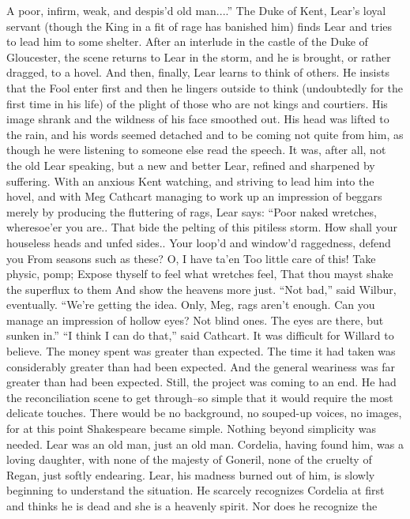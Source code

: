 \documentclass[a4paper,12pt]{article}
\begin{document}
A poor, infirm, weak, and despis’d old man....”
The Duke of Kent, Lear’s loyal servant (though the King in a fit of rage has banished him) finds
Lear and tries to lead him to some shelter. After an interlude in the castle of the Duke of Gloucester, the
scene returns to Lear in the storm, and he is brought, or rather dragged, to a hovel.
And then, finally, Lear learns to think of others. He insists that the Fool enter first and then he
lingers outside to think (undoubtedly for the first time in his life) of the plight of those who are not kings
and courtiers.
His image shrank and the wildness of his face smoothed out. His head was lifted to the rain, and
his words seemed detached and to be coming not quite from him, as though he were listening to someone
else read the speech. It was, after all, not the old Lear speaking, but a new and better Lear, refined and
sharpened by suffering. With an anxious Kent watching, and striving to lead him into the hovel, and with
Meg Cathcart managing to work up an impression of beggars merely by producing the fluttering of rags,
Lear says:
“Poor naked wretches, wheresoe’er you are..
That bide the pelting of this pitiless storm.
How shall your houseless heads and unfed sides..
Your loop’d and window’d raggedness, defend you
From seasons such as these? O, I have ta’en
Too little care of this! Take physic, pomp;
Expose thyself to feel what wretches feel,
That thou mayst shake the superflux to them
And show the heavens more just.
“Not bad,” said Wilbur, eventually. “We’re getting the idea.
Only, Meg, rags aren’t enough. Can you manage an impression of hollow eyes? Not blind ones.
The eyes are there, but sunken in.”
“I think I can do that,” said Cathcart.
It was difficult for Willard to believe. The money spent was greater than expected. The time it had
taken was considerably greater than had been expected. And the general weariness was far greater than had
been expected. Still, the project was coming to an end.
He had the reconciliation scene to get through--so simple that it would require the most delicate
touches. There would be no background, no souped-up voices, no images, for at this point Shakespeare
became simple. Nothing beyond simplicity was needed.
Lear was an old man, just an old man. Cordelia, having found him, was a loving daughter, with
none of the majesty of Goneril, none of the cruelty of Regan, just softly endearing.
Lear, his madness burned out of him, is slowly beginning to understand the situation. He scarcely
recognizes Cordelia at first and thinks he is dead and she is a heavenly spirit. Nor does he recognize the
\end{document}
